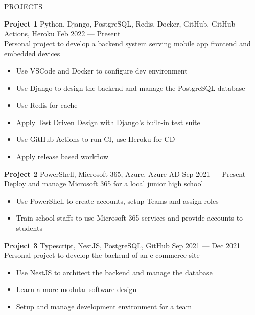 \documentclass{resume} %
\begin{document}
\begin{rSection}{PROJECTS}
  \vspace{-1.25em}
  \item \textbf{Project 1} {Python, Django, PostgreSQL, Redis, Docker, GitHub, GitHub Actions, Heroku} \hfill Feb 2022 --- Present \\
  Personal project to develop a backend system serving mobile app frontend and embedded devices \hfill
  \begin{itemize}
    \item Use VSCode and Docker to configure dev environment
    \item Use Django to design the backend and manage the PostgreSQL database
    \item Use Redis for cache
    \item Apply Test Driven Design with Django's built-in test suite
    \item Use GitHub Actions to run CI, use Heroku for CD
    \item Apply release based workflow
  \end{itemize}

  \item \textbf{Project 2} {PowerShell, Microsoft 365, Azure, Azure AD} \hfill Sep 2021 --- Present \\
  Deploy and manage Microsoft 365 for a local junior high school
  \begin{itemize}
    \item Use PowerShell to create accounts, setup Teams and assign roles
    \item Train school staffs to use Microsoft 365 services and provide accounts to students
  \end{itemize}

  \newpage

  \item \textbf{Project 3} {Typescript, NestJS, PostgreSQL, GitHub} \hfill Sep 2021 --- Dec 2021 \\
  Personal project to develop the backend of an e-commerce site \hfill
  \begin{itemize}
    \item Use NestJS to architect the backend and manage the database
    \item Learn a more modular software design
    \item Setup and manage development environment for a team
  \end{itemize}


\end{rSection}
\end{document}
